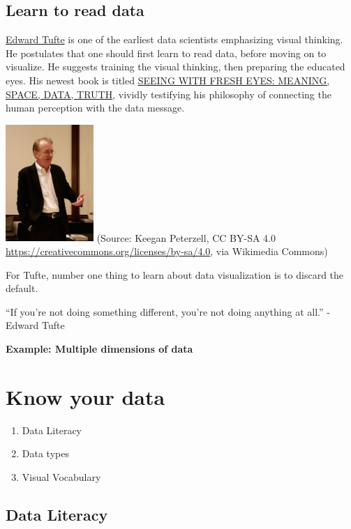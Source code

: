\documentclass[
]{book}
\providecommand{\tightlist}{%
  \setlength{\itemsep}{0pt}\setlength{\parskip}{0pt}}
\begin{document}
\hypertarget{learn-to-read-data}{%
\subsection{Learn to read data}\label{learn-to-read-data}}

\href{https://www.edwardtufte.com/tufte/}{Edward Tufte} is one of the earliest data scientists emphasizing visual thinking. He postulates that one should first learn to read data, before moving on to visualize. He suggests training the visual thinking, then preparing the educated eyes. His newest book is titled \href{https://www.edwardtufte.com/tufte/seeing-with-fresh-eyes}{SEEING WITH FRESH EYES: MEANING, SPACE, DATA, TRUTH}, vividly testifying his philosophy of connecting the human perception with the data message.

\includegraphics[width=0.25\textwidth,height=\textheight]{images/EdwardTufte.jpg}
(Source: Keegan Peterzell, CC BY-SA 4.0 \url{https://creativecommons.org/licenses/by-sa/4.0}, via Wikimedia Commons)

For Tufte, number one thing to learn about data visualization is to discard the default.

``If you're not doing something different, you're not doing anything at all.''
- Edward Tufte

\textbf{Example: Multiple dimensions of data}

\hypertarget{know-your-data}{%
\section{Know your data}\label{know-your-data}}

\begin{enumerate}
\def\labelenumi{\arabic{enumi}.}
\tightlist
\item
  Data Literacy
\item
  Data types
\item
  Visual Vocabulary
\end{enumerate}

\hypertarget{data-literacy}{%
\subsection{Data Literacy}\label{data-literacy}}
\end{document}
